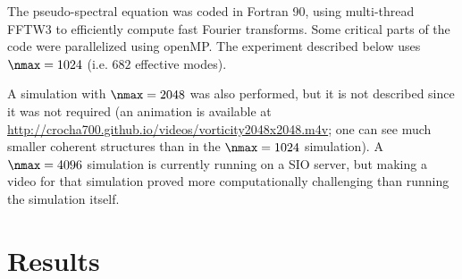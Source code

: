 \documentclass[11pt]{article}
\begin{document}
The pseudo-spectral equation was coded in Fortran 90, using multi-thread FFTW3 to efficiently
compute fast Fourier transforms. Some critical parts of the code were parallelized using openMP. The experiment described below uses $\nmax = 1024$ (i.e. $682$ effective modes). 

A simulation with $\nmax=2048$ was also performed, but it is
not described since it was not required (an animation is available at
\href{http://crocha700.github.io/videos/vorticity2048x2048.m4v}{http://crocha700.github.io/videos/vorticity2048x2048.m4v}; one can see
much smaller coherent structures than in the $\nmax=1024$ simulation). A $\nmax=4096$ simulation is currently
running on a SIO server, but making a video for that simulation proved more computationally challenging 
than running the simulation itself.

\section*{Results}
\end{document}
